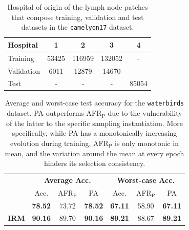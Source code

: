 \begin{table}[H]
    \centering
    \begin{tabular}{l|c|c|c|c}
    Hospital & 1 & 2 & 3 & 4 \\
    \midrule
    Training   & 53425 & 116959 & 132052 & - \\
    Validation & 6011  & 12879  & 14670 & -\\
    Test & - & - & - & 85054 \\
    \bottomrule
    \end{tabular}
    \caption{
        Hospital of origin of the lymph node patches that compose training, validation and test datasets in the \texttt{camelyon17} \cite{kohWILDSBenchmarkIntheWild2021} dataset.
    }
    \label{tab:camelyon17_idval}
\end{table}

\begin{table}[H]
    \centering
    \setlength{\tabcolsep}{2.5pt}
    \begin{tabular}{l|ccc|ccc}
    \multirow{3}{*}{} & \multicolumn{3}{c|}{\textbf{Average Acc.}} & \multicolumn{3}{c}{\textbf{Worst-case Acc.}}\\
    & Acc. & AFR$_\text{P}$ & PA & Acc. & AFR$_\text{P}$ & PA \\
    \midrule
    \textbf{{\color{tab:blue} \textbf{ERM}}} & \textbf{78.52} & 73.72 & \textbf{78.52} & \textbf{67.11} & 58.90 & \textbf{67.11} \\
    \textbf{{\color{tab:orange} \textbf{IRM}}} & \textbf{90.16} & 89.70 & \textbf{90.16} & \textbf{89.21} & 88.67 & \textbf{89.21} \\
    \bottomrule
    \end{tabular}
    \caption{
        Average and worst-case test accuracy for the \texttt{waterbirds} \cite{kohWILDSBenchmarkIntheWild2021} dataset.
        PA outperforms AFR$_\text{P}$ due to the vulnerability of the latter to the specific sampling instantiation. More specifically,
        while PA has a monotonically increasing evolution during training, AFR$_\text{P}$ is only monotonic in mean, and the variation
        around the mean at every epoch hinders its selection consistency.
    }
    \label{tab:waterbirds}
\end{table}

